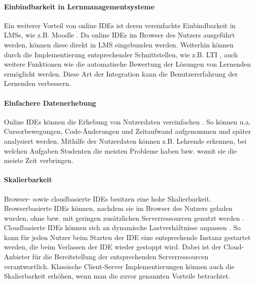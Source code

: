 \paragraph{Einbindbarkeit in Lernmanagementsysteme}
Ein weiterer Vorteil von online IDEs ist deren vereinfachte Einbindbarkeit in \acp{LMS}, wie z.B. Moodle \cite{noauthor_moodle_nodate}. Da online IDEs im Browser des Nutzers ausgeführt werden, können diese direkt in LMS eingebunden werden. Weiterhin können durch die Implementierung entsprechender Schnittstellen, wie z.B. \ac{LTI} \cite{noauthor_lti_nodate}, auch weitere Funktionen wie die automatische Bewertung der Lösungen von Lernenden ermöglicht werden. Diese Art der Integration kann die Benutzererfahrung der Lernenden verbessern.

\paragraph{Einfachere Datenerhebung}
Online IDEs können die Erhebung von Nutzerdaten vereinfachen \cite{efopoulos_wipe_2005}\cite{singh_pyguru_nodate}\cite{helminen_recording_2013}. So können u.a. Cursorbewegungen, Code-Änderungen und Zeitaufwand aufgenommen und später analysiert werden. Mithilfe der Nutzerdaten können z.B. Lehrende erkennen, bei welchen Aufgaben Studenten die meisten Probleme haben bzw. womit sie die meiste Zeit verbringen.

\paragraph{Skalierbarkeit}
Browser- sowie cloudbasierte IDEs besitzen eine hohe Skalierbarkeit. Browserbasierte IDEs können, nachdem sie im Browser des Nutzers geladen wurden, ohne bzw. mit geringen zusätzlichen Serverressourcen genutzt werden \cite{ball_beyond_2015}\cite{jefferson_pyodideu_2024}. Cloudbasierte IDEs können sich an dynamische Lastverhältnisse anpassen \cite{noauthor_azure-cloud-services_nodate}\cite{noauthor_ec2-autoscaling_nodate}. So kann für jeden Nutzer beim Starten der IDE eine entsprechende Instanz gestartet werden, die beim Verlassen der IDE wieder gestoppt wird. Dabei ist der Cloud-Anbieter für die Bereitstellung der entsprechenden Serverressourcen verantwortlich. Klassische Client-Server Implementierungen können auch die Skalierbarkeit erhöhen, wenn man die zuvor genannten Vorteile betrachtet.